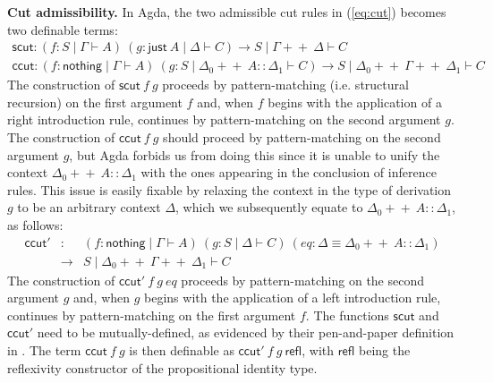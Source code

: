 \documentclass[sn-mathphys-num]{sn-jnl}%
\newcommand{\GG}{\Gamma}
\newcommand{\GD}{\Delta}
\newcommand{\vd}{\vdash}
\newcommand{\nothing}{\mathsf{nothing}}
\newcommand{\just}{\mathsf{just}}
\newcommand{\append}{+\!\!+}
\theoremstyle{thmstyleone}%
\theoremstyle{thmstyletwo}%
\theoremstyle{thmstylethree}%
\begin{document}
\noindent\textbf{Cut admissibility.}
In Agda, the two admissible cut rules in (\ref{eq:cut}) becomes two definable terms:
\[
\begin{array}{l}
  \mathsf{scut} : (f : S \mid \GG \vd A) ~(g : \just ~A \mid \GD \vd C) \to S \mid \GG \append ~\GD \vd C \\[2pt]
  \mathsf{ccut} : (f : \nothing \mid \GG \vd A) ~(g : S \mid \GD_0 \append ~A :: \GD_1 \vd C)
  \to S \mid \GD_0 \append ~\GG \append ~\GD_1 \vd C
\end{array}
\]
The construction of $\mathsf{scut} ~f ~g$ proceeds by pattern-matching (i.e. structural recursion) on the first argument $f$ and, when $f$ begins with the application of a right introduction rule, continues by pattern-matching on the second argument $g$.
The construction of $\mathsf{ccut} ~f ~g$ should proceed by pattern-matching on the second argument $g$, but Agda forbids us from doing this since it is unable to unify the context $\GD_0 \append ~A :: \GD_1$ with the ones appearing in the conclusion of inference rules. This issue is easily fixable by relaxing the context in the type of derivation $g$ to be an arbitrary context $\GD$, which we subsequently equate to $\GD_0 \append ~A :: \GD_1$, as follows:
\[
\begin{array}{rcl}
  \mathsf{ccut'} &:& (f : \nothing \mid \GG \vd A) ~(g : S \mid \GD \vd C) ~(eq : \GD \equiv \GD_0 \append ~A :: \GD_1) \\
  &\to& S \mid \GD_0 \append ~\GG \append ~\GD_1 \vd C
\end{array}
\]
The construction of $\mathsf{ccut'} ~f ~g ~eq$ proceeds by pattern-matching on the second argument $g$ and, when $g$ begins with the application of a left introduction rule, continues by pattern-matching on the first argument $f$.
The functions $\mathsf{scut}$ and $\mathsf{ccut'}$ need to be mutually-defined, as evidenced by their pen-and-paper definition in \cite{UVW:protsn,wan2024}.
The term $\mathsf{ccut} ~f ~g$ is then definable as $\mathsf{ccut'} ~f ~g ~\mathsf{refl}$, with $\mathsf{refl}$ being the reflexivity constructor of the propositional identity type.
\end{document}

